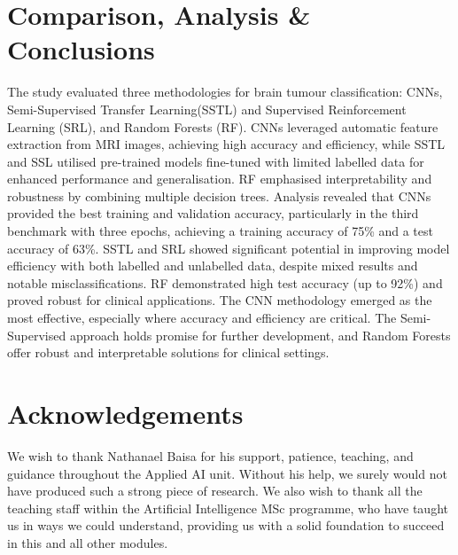 \documentclass[conference]{IEEEtran}
\begin{document}
\section{Comparison, Analysis \& Conclusions}
The study evaluated three methodologies for brain tumour classification: CNNs, Semi-Supervised Transfer Learning(SSTL) and Supervised Reinforcement Learning (SRL), and Random Forests (RF). CNNs leveraged automatic feature extraction from MRI images, achieving high accuracy and efficiency, while SSTL and SSL utilised pre-trained models fine-tuned with limited labelled data for enhanced performance and generalisation. RF emphasised interpretability and robustness by combining multiple decision trees. Analysis revealed that CNNs provided the best training and validation accuracy, particularly in the third benchmark with three epochs, achieving a training accuracy of 75\% and a test accuracy of 63\%. SSTL and SRL showed significant potential in improving model efficiency with both labelled and unlabelled data, despite mixed results and notable misclassifications. RF demonstrated high test accuracy (up to 92\%) and proved robust for clinical applications. The CNN methodology emerged as the most effective, especially where accuracy and efficiency are critical. The Semi-Supervised approach holds promise for further development, and Random Forests offer robust and interpretable solutions for clinical settings. 

\section{Acknowledgements}
We wish to thank Nathanael Baisa for his support, patience, teaching, and guidance throughout the Applied AI unit. Without his help, we surely would not have produced such a strong piece of research. We also wish to thank all the teaching staff within the Artificial Intelligence MSc programme, who have taught us in ways we could understand, providing us with a solid foundation to succeed in this and all other modules.

\nocite{*} %

\normalsize

\clearpage

\clearpage

\clearpage

\end{document}
